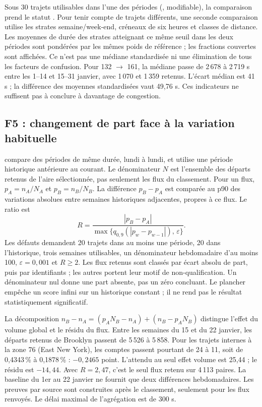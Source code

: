 Sous 30 trajets utilisables dans l'une des périodes (, modifiable), la comparaison prend le statut . Pour tenir compte de trajets différents, une seconde comparaison utilise les
strates semaine/week-end, créneaux de six heures et classes de distance. Les moyennes de durée des strates atteignant ce même seuil dans les deux périodes sont pondérées par les
mêmes poids de référence ; les fractions couvertes sont affichées. Ce n'est pas
une médiane standardisée ni une élimination de tous les facteurs de confusion.
Pour 132 $\to$ 161, la médiane passe de 2\,678 à 2\,719 s entre les
1--14 et 15--31 janvier, avec 1\,070 et 1\,359 retenus. L'écart médian est
41 s ; la différence des moyennes standardisées vaut 49,76 s. Ces indicateurs
ne suffisent pas à conclure à davantage de congestion.

\subsection{F5 : changement de part face à la variation habituelle}
 compare des périodes de même durée, lundi à lundi,
et utilise une période historique antérieure au courant. Le dénominateur $N$
est l'ensemble des départs retenus de l'aire sélectionnée, pas seulement les
flux du classement. Pour un flux, $p_A=n_A/N_A$ et $p_B=n_B/N_B$.
La différence $p_B-p_A$ est comparée au p90 des variations absolues entre semaines
historiques adjacentes, propres à ce flux. Le ratio est
\[
R=\frac{|p_B-p_A|}{\max\{q_{0,9}(|p_w-p_{w-1}|),\,\varepsilon\}}.
\]
Les défauts demandent 20 trajets dans au moins une période, 20 dans l'historique,
trois semaines utilisables, un dénominateur hebdomadaire d'au moins 100,
$\varepsilon=0{,}001$ et $R\geq2$. Les flux retenus sont classés par écart absolu
de part, puis par identifiants ; les autres portent leur motif de non-qualification.
Un dénominateur nul donne une part absente, pas un zéro concluant. Le plancher
empêche un score infini sur un historique constant ; il ne rend pas le résultat
statistiquement significatif.

La décomposition $n_B-n_A=(p_A N_B-n_A)+(n_B-p_A N_B)$ distingue l'effet du
volume global et le résidu du flux. Entre les semaines du 15 et du 22 janvier,
les départs retenus de Brooklyn passent de 5\,526 à 5\,858. Pour les trajets internes à la zone 76 (East New York), les comptes passent pourtant de 24 à 11, soit de 0,4343\,\% à 0,1878\,\% : $-0{,}2465$ point. L'attendu au seul effet volume est 25,44 ; le résidu est $-14{,}44$. Avec $R=2{,}47$, c'est le seul flux retenu sur 4\,113 paires. La baseline du 1er au 22 janvier ne fournit que deux différences
hebdomadaires. Les preuves par source sont construites après le classement, seulement pour les flux renvoyés. Le délai maximal de l'agrégation est de 300 s.
